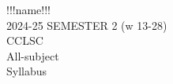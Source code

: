 \documentclass[32pt]{book}
\begin{document}
\Huge
!!!name!!! \\
2024-25 SEMESTER 2 (w 13-28) \\
CCLSC \\
All-subject \\
Syllabus

\newpage


\end{document}
